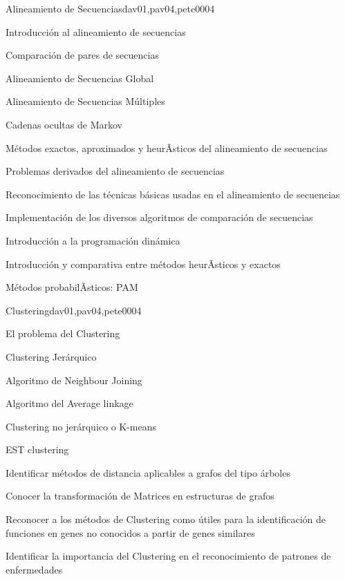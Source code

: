 \begin{syllabus}
\begin{unit}{Alineamiento de Secuencias}{dav01,pav04,pete00}{0}{4}
\begin{topics}
        \item Introducción al alineamiento de secuencias
        \item Comparación de pares de secuencias
        \item Alineamiento de Secuencias Global
        \item Alineamiento de Secuencias Múltiples
        \item Cadenas ocultas de Markov
        \item Métodos exactos, aproximados y heurÃ­sticos del alineamiento de secuencias
        \item Problemas derivados del alineamiento de secuencias
    \end{topics}
    \begin{learningoutcomes}
        \item Reconocimiento de las técnicas básicas usadas en el alineamiento de secuencias
        \item Implementación de los diversos algoritmos de comparación de secuencias
        \item Introducción a la programación dinámica
        \item Introducción y comparativa entre métodos heurÃ­sticos y exactos
        \item Métodos probabilÃ­sticos: PAM
    \end{learningoutcomes}
\end{unit}

\begin{unit}{Clustering}{dav01,pav04,pete00}{0}{4}
\begin{topics}
        \item El problema del Clustering
        \item Clustering Jerárquico
        \item Algoritmo de Neighbour Joining
        \item Algoritmo del Average linkage
        \item Clustering no jerárquico o K-means
        \item EST clustering
    \end{topics}
    \begin{learningoutcomes}
        \item Identificar métodos de distancia aplicables a grafos del tipo árboles
        \item Conocer la transformación de Matrices en estructuras de grafos
        \item Reconocer a los métodos de Clustering como útiles para la identificación de funciones en genes no conocidos a partir de genes similares
        \item Identificar la importancia del Clustering en el reconocimiento de patrones de enfermedades
    \end{learningoutcomes}
\end{unit}


\end{syllabus}

